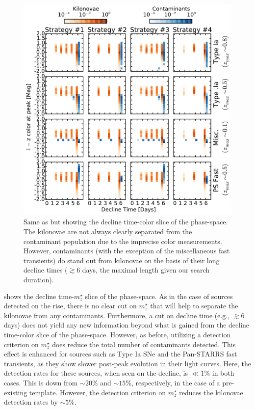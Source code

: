 \begin{figure}[t!]
\centering
\includegraphics[width=\textwidth]{./figs/chapter2/ch2_f16.pdf}
\caption{Same as  but showing the decline time-color slice of the phase-space. The kilonovae are not always clearly separated from the contaminant population due to the imprecise color measurements. However, contaminants (with the exception of the miscellaneous fast transients) do stand out from kilonovae on the basis of their long decline times ($\gtrsim 6$ days, the maximal length given our search duration).}
\label{fig:ch2_phasedecdiff}
\end{figure}

\clearpage
{} shows the decline time-$m^{\star}_z$ slice of the phase-space. As in the case of sources detected on the rise, there is no clear cut on $m^{\star}_z$ that will help to separate the kilonovae from any contaminants. Furthermore, a cut on decline time (e.g., $\gtrsim 6$ days) does not yield any new information beyond what is gained from the decline time-color slice of the phase-space. However, as before, utilizing a detection criterion on $m^{\star}_z$ does reduce the total number of contaminants detected. This effect is enhanced for sources such as Type Ia SNe and the Pan-STARRS fast transients, as they show slower post-peak evolution in their light curves. Here, the detection rates for these sources, when seen on the decline, is $\ll1\%$ in both cases. This is down from $\sim20\%$ and $\sim15\%$, respectively, in the case of a pre-existing template. However, the detection criterion on $m^{\star}_z$ reduces the kilonovae detection rates by $\sim5\%$.


